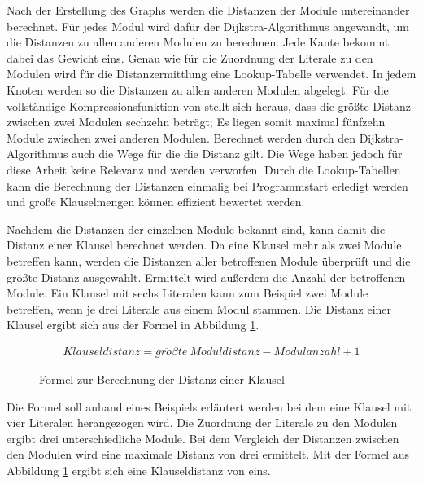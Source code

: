 Nach der Erstellung des Graphs werden die Distanzen der Module untereinander berechnet. Für jedes Modul wird dafür der Dijkstra-Algorithmus \cite{dijkstra} angewandt,
um die Distanzen zu allen anderen Modulen zu berechnen. Jede Kante bekommt dabei das Gewicht eins. Genau wie für die Zuordnung der Literale zu den Modulen wird für
die Distanzermittlung eine Lookup-Tabelle verwendet. In jedem Knoten werden so die Distanzen zu allen anderen Modulen abgelegt. Für die vollständige Kompressionsfunktion
von  stellt sich heraus, dass die größte Distanz zwischen zwei Modulen sechzehn beträgt; Es liegen somit maximal fünfzehn Module zwischen zwei anderen
Modulen. Berechnet werden durch den Dijkstra-Algorithmus auch die Wege für die die Distanz gilt. Die Wege haben jedoch für diese Arbeit keine Relevanz und werden
verworfen. Durch die Lookup-Tabellen kann die Berechnung der Distanzen einmalig bei Programmstart erledigt werden und große Klauselmengen können effizient bewertet werden.

Nachdem die Distanzen der einzelnen Module bekannt sind, kann damit die Distanz einer Klausel berechnet werden. Da eine Klausel mehr als zwei Module betreffen kann, werden
die Distanzen aller betroffenen Module überprüft und die größte Distanz ausgewählt. Ermittelt wird außerdem die Anzahl der betroffenen Module. Ein Klausel mit sechs Literalen
kann zum Beispiel zwei Module betreffen, wenn je drei Literale aus einem Modul stammen. Die Distanz einer Klausel ergibt sich aus der Formel in Abbildung \ref{eq:clausedistance}.
\begin{figure}[!h]
  \begin{align*}
  Klauseldistanz = gr\ddot{o}{\beta}te~Moduldistanz - Modulanzahl + 1
  \end{align*}
  \caption{Formel zur Berechnung der Distanz einer Klausel}
  \label{eq:clausedistance}
\end{figure}

Die Formel soll anhand eines Beispiels erläutert werden bei dem eine Klausel mit vier Literalen herangezogen wird. Die Zuordnung der Literale
zu den Modulen ergibt drei unterschiedliche Module. Bei dem Vergleich der Distanzen zwischen den Modulen wird eine maximale Distanz von drei ermittelt.
Mit der Formel aus Abbildung \ref{eq:clausedistance} ergibt sich eine Klauseldistanz von eins.


